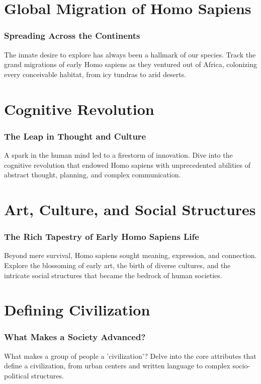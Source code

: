 \documentclass[a4paper,12pt]{book}
\begin{document}
\chapter{Global Migration of Homo Sapiens}
\subsection*{Spreading Across the Continents}
The innate desire to explore has always been a hallmark of our species. Track the grand migrations of early Homo sapiens as they ventured out of Africa, colonizing every conceivable habitat, from icy tundras to arid deserts.

\chapter{Cognitive Revolution}
\subsection*{The Leap in Thought and Culture}
A spark in the human mind led to a firestorm of innovation. Dive into the cognitive revolution that endowed Homo sapiens with unprecedented abilities of abstract thought, planning, and complex communication.

\chapter{Art, Culture, and Social Structures}
\subsection*{The Rich Tapestry of Early Homo Sapiens Life}
Beyond mere survival, Homo sapiens sought meaning, expression, and connection. Explore the blossoming of early art, the birth of diverse cultures, and the intricate social structures that became the bedrock of human societies.



\chapter{Defining Civilization}
\subsection*{What Makes a Society Advanced?}
What makes a group of people a 'civilization'? Delve into the core attributes that define a civilization, from urban centers and written language to complex socio-political structures.
\end{document}

